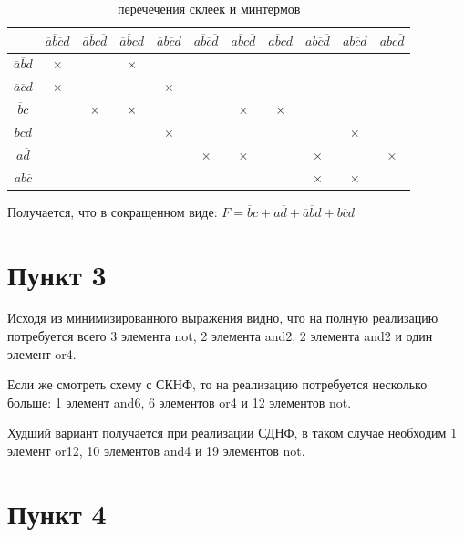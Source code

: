 \documentclass[a4paper]{article}
\begin{document}
  \begin{table}[H]
    \centering
    \begin{tabular}{| c | c | c | c | c | c | c | c | c | c | c |}
      \hline
      &
      $\overline{a}\overline{b}\overline{c}d$ &
      $\overline{a}\overline{b}c\overline{d}$ &
      $\overline{a}\overline{b}cd$ &
      $\overline{a}b\overline{c}d$ &
      $a\overline{b}\overline{c}\overline{d}$ &
      $a\overline{b}c\overline{d}$ &
      $a\overline{b}cd$ &
      $ab\overline{c}\overline{d}$ &
      $ab\overline{c}d $ &
      $abc\overline{d}$ \\
      \hline
      $\overline{a}\overline{b}d$ & $\times$ & & $\times$ & & & & & & & \\
      \hline
      $\overline{a}\overline{c}d$ & $\times$ & & & $\times$ & & & & & & \\
      \hline
      $\overline{b}c$ & & $\times$ & $\times$ & & & $\times$ & $\times$ & & & \\
      \hline
      $b\overline{c}d$ & & & & $\times$ & & & & & $\times$ & \\
      \hline
      $a\overline{d}$ & & & & & $\times$ &$\times$ & & $\times$ & & $\times$ \\
      \hline
      $ab\overline{c}$ & & & & & & & & $\times$ & $\times$ & \\
      \hline
    \end{tabular}
    \caption{перечечения склеек и минтермов}
  \end{table}

  Получается, что в сокращенном виде: $F = \overline{b}c + a\overline{d} + \overline{a}\overline{b}d + b\overline{c}d$

  \section*{Пункт 3}

  Исходя из минимизированного выражения видно, что на полную реализацию потребуется всего
  3 элемента not, 2 элемента and2, 2 элемента and2 и один элемент or4.

  Если же смотреть схему с СКНФ, то на реализацию потребуется несколько больше:
  1 элемент and6, 6 элементов or4 и 12 элементов not.

  Худший вариант получается при реализации СДНФ, в таком случае необходим 1 элемент or12,
  10 элементов and4 и 19 элементов not.

  \section*{Пункт 4}
\end{document}
